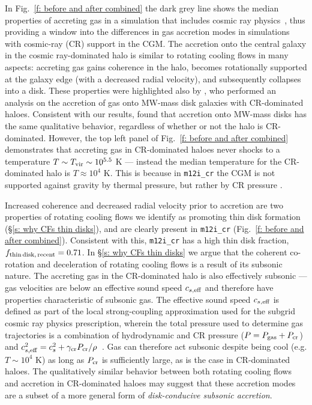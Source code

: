 \documentclass[fleqn,usenatbib]{mnras}
\newcommand{\fthin}{f_{\rm thin\,disk,\,recent}}
\begin{document}
In Fig.~\ref{f: before and after combined} the dark grey line shows the median properties of accreting gas in a simulation that includes cosmic ray physics~\citep[][]{Chan2019, Hopkins2020a}, thus providing a window into the differences in gas accretion modes in simulations with cosmic-ray (CR) support in the CGM.
The accretion onto the central galaxy in the cosmic ray-dominated halo is similar to rotating cooling flows in many aspects:
accreting gas gains coherence in the halo, becomes rotationally supported at the galaxy edge (with a decreased radial velocity), and subsequently collapses into a disk.
These properties were highlighted also by \cite{Trapp2021}, who performed an analysis on the accretion of gas onto MW-mass disk galaxies with CR-dominated haloes.
Consistent with our results, \citeauthor{Trapp2021} found that accretion onto MW-mass disks has the same qualitative behavior, regardless of whether or not the halo is CR-dominated.
However, the top left panel of Fig.~\ref{f: before and after combined} demonstrates that accreting gas in CR-dominated haloes never shocks to a temperature $T \sim T_{\rm vir} \sim 10^{5.5}$ K --- instead the median temperature for the CR-dominated halo is $T\approx10^4$ K.
This is because in \texttt{m12i\_cr} the CGM is not supported against gravity by thermal pressure, but rather by CR pressure \citep{Ji2020}.

Increased coherence and decreased radial velocity prior to accretion are two properties of rotating cooling flows we identify as promoting thin disk formation (\S\ref{s: why CFs thin disks}), and are clearly present in \texttt{m12i\_cr} (Fig.~\ref{f: before and after combined}).
Consistent with this, \texttt{m12i\_cr} has a high thin disk fraction, $\fthin=0.71$.
In \S\ref{s: why CFs thin disks} we argue that the coherent co-rotation and deceleration of rotating cooling flows is a result of its subsonic nature.
The accreting gas in the CR-dominated halo is also effectively subsonic --- gas velocities are below an effective sound speed $c_{s,{\rm eff}}$ and therefore have properties characteristic of subsonic gas.
The effective sound speed $c_{s,{\rm eff}}$ is defined as part of the local strong-coupling approximation used for the subgrid cosmic ray physics prescription, wherein the total pressure used to determine gas trajectories is a combination of hydrodynamic and CR pressure ($P = P_{\rm gas} + P_{\rm cr}$) and $c^2_{s,{\rm eff}}=c^2_{s}+\gamma_{\rm cr} P_{\rm cr}/\rho$~\citep{Hopkins2020a}.
Gas can therefore act subsonic despite being cool (e.g. $T\sim10^4$ K) as long as $P_{\rm cr}$ is sufficiently large, as is the case in CR-dominated haloes.
The qualitatively similar behavior between both rotating cooling flows and accretion in CR-dominated haloes may suggest that these accretion modes are a subset of a more general form of \textit{disk-conducive subsonic accretion}.
\end{document}
